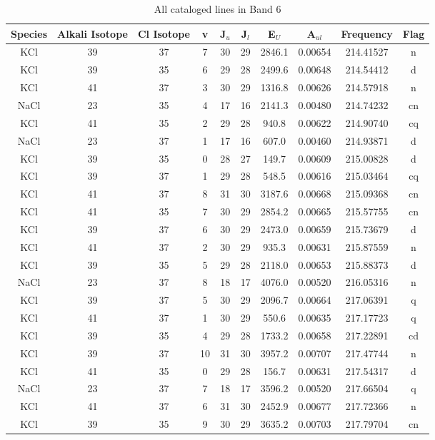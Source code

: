 \begin{table*}[htp]
\centering
\caption{All cataloged lines in Band 6}
\begin{tabular}{cccccccccc}
\label{tab:all_detections_B6}
Species & Alkali Isotope & Cl Isotope & v & J$_u$ & J$_l$ & E$_U$ & A$_{ul}$ & Frequency & Flag \\
\hline
KCl & 39 & 37 & 7 & 30 & 29 & 2846.1 & 0.00654 & 214.41527 & n \\
KCl & 39 & 35 & 6 & 29 & 28 & 2499.6 & 0.00648 & 214.54412 & d \\
KCl & 41 & 37 & 3 & 30 & 29 & 1316.8 & 0.00626 & 214.57918 & n \\
NaCl & 23 & 35 & 4 & 17 & 16 & 2141.3 & 0.00480 & 214.74232 & cn \\
KCl & 41 & 35 & 2 & 29 & 28 & 940.8 & 0.00622 & 214.90740 & cq \\
NaCl & 23 & 37 & 1 & 17 & 16 & 607.0 & 0.00460 & 214.93871 & d \\
KCl & 39 & 35 & 0 & 28 & 27 & 149.7 & 0.00609 & 215.00828 & d \\
KCl & 39 & 37 & 1 & 29 & 28 & 548.5 & 0.00616 & 215.03464 & cq \\
KCl & 41 & 37 & 8 & 31 & 30 & 3187.6 & 0.00668 & 215.09368 & cn \\
KCl & 41 & 35 & 7 & 30 & 29 & 2854.2 & 0.00665 & 215.57755 & cn \\
KCl & 39 & 37 & 6 & 30 & 29 & 2473.0 & 0.00659 & 215.73679 & d \\
KCl & 41 & 37 & 2 & 30 & 29 & 935.3 & 0.00631 & 215.87559 & n \\
KCl & 39 & 35 & 5 & 29 & 28 & 2118.0 & 0.00653 & 215.88373 & d \\
NaCl & 23 & 37 & 8 & 18 & 17 & 4076.0 & 0.00520 & 216.05316 & n \\
KCl & 39 & 37 & 5 & 30 & 29 & 2096.7 & 0.00664 & 217.06391 & q \\
KCl & 41 & 37 & 1 & 30 & 29 & 550.6 & 0.00635 & 217.17723 & q \\
KCl & 39 & 35 & 4 & 29 & 28 & 1733.2 & 0.00658 & 217.22891 & cd \\
KCl & 39 & 37 & 10 & 31 & 30 & 3957.2 & 0.00707 & 217.47744 & n \\
KCl & 41 & 35 & 0 & 29 & 28 & 156.7 & 0.00631 & 217.54317 & d \\
NaCl & 23 & 37 & 7 & 18 & 17 & 3596.2 & 0.00520 & 217.66504 & q \\
KCl & 41 & 37 & 6 & 31 & 30 & 2452.9 & 0.00677 & 217.72366 & n \\
KCl & 39 & 35 & 9 & 30 & 29 & 3635.2 & 0.00703 & 217.79704 & cn \\

\end{tabular}
\end{table*}
